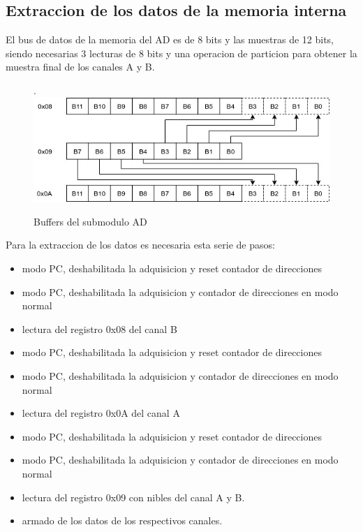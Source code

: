 \subsection{Extraccion de los datos de la memoria interna}

El bus de datos de la memoria del AD es de 8 bits y las muestras de 12 bits,
siendo necesarias 3 lecturas de 8 bits y una operacion de particion para
obtener la muestra final de los canales A y B.

\begin{figure}[!htb].
    \includegraphics[width=\linewidth]{../figures/d8.jpg}
    \caption{Buffers del submodulo AD}
    \label{fig:d8}
\end{figure}

Para la extraccion de los datos es necesaria esta serie de pasos:

\begin{itemize}
    \item modo PC, deshabilitada la adquisicion y reset contador de direcciones
    \item modo PC, deshabilitada la adquisicion y contador de direcciones en modo normal
    \item lectura del registro 0x08 del canal B
    \item modo PC, deshabilitada la adquisicion y reset contador de direcciones
    \item modo PC, deshabilitada la adquisicion y contador de direcciones en modo normal
    \item lectura del registro 0x0A del canal A
    \item modo PC, deshabilitada la adquisicion y reset contador de direcciones
    \item modo PC, deshabilitada la adquisicion y contador de direcciones en modo normal
    \item lectura del registro 0x09 con nibles del canal A y B.
    \item armado de los datos de los respectivos canales.
\end{itemize}

